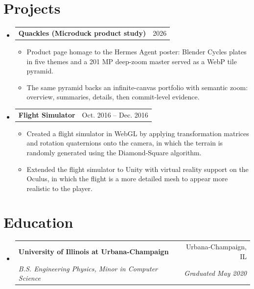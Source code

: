 \documentclass[letterpaper,11pt]{article}
\makeatletter
\newcommand{\resumeItem}[1]{\item\small{#1 \vspace{-2pt}}}
\newcommand{\resumeSubheading}[4]{%
  \vspace{-2pt}\item
    \begin{tabular*}{0.97\textwidth}[t]{l@{\extracolsep{\fill}}r}
      \textbf{#1} & #2 \\
      \textit{\small#3} & \textit{\small #4} \\
    \end{tabular*}\vspace{-7pt}
}
\newcommand{\resumeProjectHeading}[2]{%
    \item
    \begin{tabular*}{0.97\textwidth}{l@{\extracolsep{\fill}}r}
      \small#1 & #2 \\
    \end{tabular*}\vspace{-7pt}
}
\newcommand{\resumeSubHeadingListStart}{\begin{itemize}[leftmargin=0.15in, label={}]}
\newcommand{\resumeSubHeadingListEnd}{\end{itemize}}
\newcommand{\resumeItemListStart}{\begin{itemize}}
\newcommand{\resumeItemListEnd}{\end{itemize}\vspace{-5pt}}
\makeatother
\begin{document}
\section{Projects}
  \resumeSubHeadingListStart
      \resumeProjectHeading
          {\textbf{Quackles (Microduck product study)}}{2026}
          \resumeItemListStart
            \resumeItem{Product page homage to the Hermes Agent poster: Blender Cycles plates in five themes and a 201 MP deep-zoom master served as a WebP tile pyramid.}
            \resumeItem{The same pyramid backs an infinite-canvas portfolio with semantic zoom: overview, summaries, details, then commit-level evidence.}
          \resumeItemListEnd
      \resumeProjectHeading
          {\textbf{Flight Simulator}}{Oct. 2016 -- Dec. 2016}
          \resumeItemListStart
            \resumeItem{Created a flight simulator in WebGL by applying transformation matrices and rotation quaternions onto the camera, in which the terrain is randomly generated using the Diamond-Square algorithm.}
            \resumeItem{Extended the flight simulator to Unity with virtual reality support on the Oculus, in which the flight is a more detailed mesh to appear more realistic to the player.}
          \resumeItemListEnd
  \resumeSubHeadingListEnd

\section{Education}
  \resumeSubHeadingListStart
    \resumeSubheading
      {University of Illinois at Urbana-Champaign}{Urbana-Champaign, IL}
      {B.S. Engineering Physics, Minor in Computer Science}{Graduated May 2020}
  \resumeSubHeadingListEnd
\end{document}
